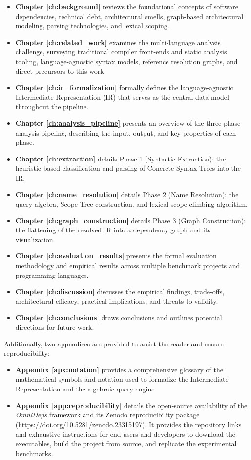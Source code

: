 \begin{itemize}
  \item \textbf{Chapter \ref{ch:background}} reviews the foundational concepts
    of software dependencies, technical debt, architectural smells, graph-based
    architectural modeling, parsing technologies, and lexical scoping.
  \item \textbf{Chapter \ref{ch:related_work}} examines the multi-language
    analysis challenge, surveying traditional compiler front-ends and
    static analysis tooling, language-agnostic syntax models, reference
    resolution graphs, and direct precursors to this work.
  \item \textbf{Chapter \ref{ch:ir_formalization}} formally defines the
    language-agnostic Intermediate Representation (IR) that serves as the
    central data model throughout the pipeline.
  \item \textbf{Chapter \ref{ch:analysis_pipeline}} presents an overview of
    the three-phase analysis pipeline, describing the input, output, and
    key properties of each phase.
  \item \textbf{Chapter \ref{ch:extraction}} details Phase 1 (Syntactic
    Extraction): the heuristic-based classification and parsing of
    Concrete Syntax Trees into the IR.
  \item \textbf{Chapter \ref{ch:name_resolution}} details Phase 2 (Name
    Resolution): the query algebra, Scope Tree construction, and lexical
    scope climbing algorithm.
  \item \textbf{Chapter \ref{ch:graph_construction}} details Phase 3 (Graph
    Construction): the flattening of the resolved IR into a dependency
    graph and its visualization.
  \item \textbf{Chapter \ref{ch:evaluation_results}} presents the
    formal evaluation methodology and empirical results across multiple
    benchmark projects and programming languages.
  \item \textbf{Chapter \ref{ch:discussion}} discusses the empirical findings,
    trade-offs, architectural efficacy, practical implications, and
    threats to validity.
  \item \textbf{Chapter \ref{ch:conclusions}} draws conclusions and outlines
    potential directions for future work.
\end{itemize}

Additionally, two appendices are provided to assist the reader and
ensure reproducibility:
\begin{itemize}
  \item \textbf{Appendix \ref{apx:notation}} provides a comprehensive
    glossary of the mathematical symbols and notation used to
    formalize the Intermediate Representation and the algebraic query engine.
  \item \textbf{Appendix \ref{app:reproducibility}} details the
    open-source availability of the \textit{OmniDeps} framework and its
    Zenodo reproducibility package
    (\url{https://doi.org/10.5281/zenodo.23315197}).
    It provides the repository links and exhaustive instructions for
    end-users and developers to download the executables, build the
    project from source, and replicate the experimental benchmarks.
\end{itemize}
